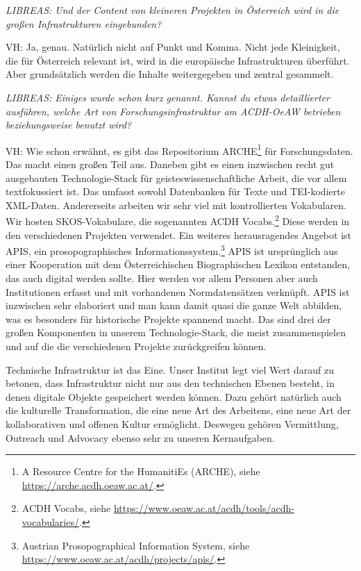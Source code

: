 \documentclass[a4paper,
fontsize=11pt,
oneside,
numbers=noperiodatend,
parskip=half-,
bibliography=totoc,
final
]{scrartcl}
\begin{document}
\emph{LIBREAS: Und der Content von kleineren Projekten in Österreich
wird in die großen Infrastrukturen eingebunden?}

VH: Ja, genau. Natürlich nicht auf Punkt und Komma. Nicht jede
Kleinigkeit, die für Österreich relevant ist, wird in die europäische
Infrastrukturen überführt. Aber grundsätzlich werden die Inhalte
weitergegeben und zentral gesammelt.

\emph{LIBREAS: Einiges wurde schon kurz genannt. Kannst du etwas
detaillierter ausführen, welche Art von Forschungsinfrastruktur am
ACDH-OeAW betrieben beziehungsweise benutzt wird?}

VH: Wie schon erwähnt, es gibt das Repositorium ARCHE\footnote{A
  Resource Centre for the HumanitiEs (ARCHE), siehe
  \url{https://arche.acdh.oeaw.ac.at/}.} für Forschungsdaten. Das macht
einen großen Teil aus. Daneben gibt es einen inzwischen recht gut
ausgebauten Technologie-Stack für geisteswissenschaftliche Arbeit, die
vor allem textfokussiert ist. Das umfasst sowohl Datenbanken für Texte
und TEI-kodierte XML-Daten. Andererseits arbeiten wir sehr viel mit
kontrollierten Vokabularen. Wir hosten SKOS-Vokabulare, die sogenannten
ACDH Vocabs.\footnote{ACDH Vocabs, siehe
  \url{https://www.oeaw.ac.at/acdh/tools/acdh-vocabularies/}.} Diese
werden in den verschiedenen Projekten verwendet. Ein weiteres
herausragendes Angebot ist APIS, ein prosopographisches
Informationssystem.\footnote{Austrian Prosopographical Information
  System, siehe \url{https://www.oeaw.ac.at/acdh/projects/apis/}.} APIS
ist ursprünglich aus einer Kooperation mit dem Österreichischen
Biographischen Lexikon entstanden, das auch digital werden sollte. Hier
werden vor allem Personen aber auch Institutionen erfasst und mit
vorhandenen Normdatensätzen verknüpft. APIS ist inzwischen sehr
elaboriert und man kann damit quasi die ganze Welt abbilden, was es
besonders für historische Projekte spannend macht. Das sind drei der
großen Komponenten in unserem Technologie-Stack, die meist
zusammenspielen und auf die die verschiedenen Projekte zurückgreifen
können.

Technische Infrastruktur ist das Eine. Unser Institut legt viel Wert
darauf zu betonen, dass Infrastruktur nicht nur aus den technischen
Ebenen besteht, in denen digitale Objekte gespeichert werden können.
Dazu gehört natürlich auch die kulturelle Transformation, die eine neue
Art des Arbeitens, eine neue Art der kollaborativen und offenen Kultur
ermöglicht. Deswegen gehören Vermittlung, Outreach und Advocacy ebenso
sehr zu unseren Kernaufgaben.
\end{document}
